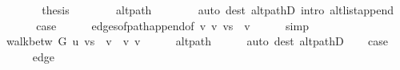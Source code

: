\begin{isabellebody}
\ \ \ \ \isamarkupfalse%
\ \isamarkupfalse%
\ {\isacharquery}{\kern0pt}thesis\isanewline
\ \ \ \ \ \ \isamarkupfalse%
\ alt{\isacharunderscore}{\kern0pt}path\isanewline
\ \ \ \ \ \ \isamarkupfalse%
\ {\isacharparenleft}{\kern0pt}auto\ dest{\isacharcolon}{\kern0pt}\ alt{\isacharunderscore}{\kern0pt}pathD{\isacharparenleft}{\kern0pt}{}{\isacharparenright}{\kern0pt}\ intro{\isacharcolon}{\kern0pt}\ alt{\isacharunderscore}{\kern0pt}list{\isacharunderscore}{\kern0pt}append{\isacharunderscore}{\kern0pt}{}{\isacharprime}{\kern0pt}{\isacharparenright}{\kern0pt}\isanewline
\ \ \isamarkupfalse%
\isanewline
\ \ \isamarkupfalse%
\ {\isacharquery}{\kern0pt}case\isanewline
\ \ \ \ \isamarkupfalse%
\ edges{\isacharunderscore}{\kern0pt}of{\isacharunderscore}{\kern0pt}path{\isacharunderscore}{\kern0pt}append{\isacharunderscore}{\kern0pt}{}{\isacharbrackleft}{\kern0pt}of\ {\isachardoublequoteopen}{\isacharbrackleft}{\kern0pt}v{\isacharprime}{\kern0pt}{\isacharcomma}{\kern0pt}\ v{\isacharbrackright}{\kern0pt}{\isachardoublequoteclose}\ {\isachardoublequoteopen}vs\ {\isacharat}{\kern0pt}\ {\isacharbrackleft}{\kern0pt}v{\isacharprime}{\kern0pt}{\isacharprime}{\kern0pt}{\isacharbrackright}{\kern0pt}{\isachardoublequoteclose}{\isacharbrackright}{\kern0pt}\isanewline
\ \ \ \ \isamarkupfalse%
\ simp\isanewline
{}\isamarkupfalse%
\isanewline
\ \ \isamarkupfalse%
\ {}\isanewline
\ \ \isamarkupfalse%
\ {\isachardoublequoteopen}walk{\isacharunderscore}{\kern0pt}betw\ G\ u\ {\isacharparenleft}{\kern0pt}vs\ {\isacharat}{\kern0pt}\ {\isacharbrackleft}{\kern0pt}v{\isacharprime}{\kern0pt}{\isacharprime}{\kern0pt}{\isacharbrackright}{\kern0pt}\ {\isacharat}{\kern0pt}\ {\isacharbrackleft}{\kern0pt}v{\isacharprime}{\kern0pt}{\isacharbrackright}{\kern0pt}{\isacharparenright}{\kern0pt}\ v{\isacharprime}{\kern0pt}{\isachardoublequoteclose}\isanewline
\ \ \ \ \isamarkupfalse%
\ alt{\isacharunderscore}{\kern0pt}path\isanewline
\ \ \ \ \isamarkupfalse%
\ {\isacharparenleft}{\kern0pt}auto\ dest{\isacharcolon}{\kern0pt}\ alt{\isacharunderscore}{\kern0pt}pathD{\isacharparenleft}{\kern0pt}{}{\isacharparenright}{\kern0pt}{\isacharparenright}{\kern0pt}\isanewline
\ \ \isamarkupfalse%
\ {\isacharquery}{\kern0pt}case\isanewline
\ \ \ \ \isamarkupfalse%
\ edge\isanewline
\ \ \ \ \isamarkupfalse%

\end{isabellebody}

